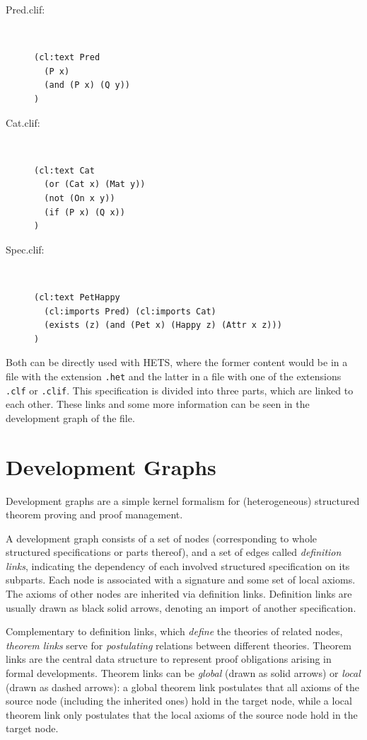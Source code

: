\documentclass{article}
\newcommand{\normalTEXTSC}[2]{{#1\scriptsize#2}}
\newcommand     {\Hets}{\normalTEXTSC{H}{ETS}\xspace}
\begin{document}
\begin{description}
  \item[Pred.clif:]~\\
\begin{lstlisting}[language=clif]
(cl:text Pred 
  (P x)
  (and (P x) (Q y))
)
\end{lstlisting}
  \item[Cat.clif:]~\\
\begin{lstlisting}[language=clif]
(cl:text Cat 
  (or (Cat x) (Mat y))
  (not (On x y))
  (if (P x) (Q x))
)
\end{lstlisting}
  \item[Spec.clif:]~\\
\begin{lstlisting}[language=clif]
(cl:text PetHappy 
  (cl:imports Pred) (cl:imports Cat)
  (exists (z) (and (Pet x) (Happy z) (Attr x z)))
)
\end{lstlisting}
\end{description}

Both can be directly used with \Hets, where the former content would be in a 
file with the extension \texttt{.het} and the latter in a file with one of the extensions 
\texttt{.clf} or \texttt{.clif}. This specification is divided into three 
parts, which are linked to each other. These links and some more information can 
be seen in the development graph of the file.


\section{Development Graphs}\label{sec:DevGraph}

Development graphs are a simple kernel formalism for (heterogeneous)
structured theorem proving and proof management.

A development graph consists of a set of nodes (corresponding to whole
structured specifications or parts thereof), and a set of edges
called \emph{definition links}, indicating the dependency of each
involved structured specification on its subparts.  Each node is
associated with a signature and some set of local axioms.  The axioms
of other nodes are inherited via definition links.  Definition links
are usually drawn as black solid arrows, denoting an import of another
specification.

Complementary to definition links, which \emph{define} the theories of
related nodes, \emph{theorem links} serve for \emph{postulating}
relations between different theories. Theorem links are the central
data structure to represent proof obligations arising in formal
developments.
Theorem links can be \emph{global} (drawn as solid arrows) or
\emph{local} (drawn as dashed arrows): a global theorem link
postulates that all axioms of the source node (including the inherited
ones) hold in the target node, while a local theorem link only postulates
that the local axioms of the source node hold in the target node.
\end{document}
